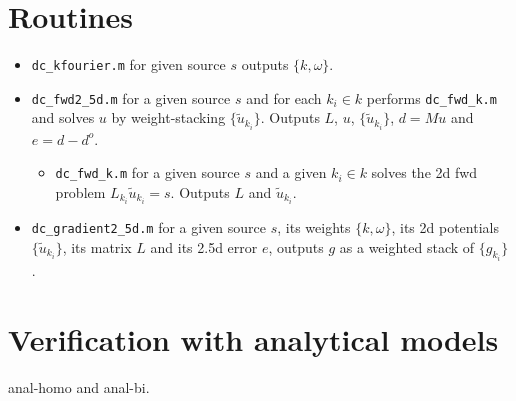 \documentclass[a4paper,12pt]{article}
\begin{document}
\section*{Routines}
\begin{itemize}
\item \color{boiseBlue}\texttt{dc\_kfourier.m} \color{black} for given source $s$ outputs $\{k,\omega\}$.
\item \color{boiseBlue}\texttt{dc\_fwd2\_5d.m} \color{black} for a given source $s$ and for each $k_i\in k$ performs \color{rojoAmor}\texttt{dc\_fwd\_k.m} \color{black} and solves $u$ by weight-stacking $\{\tilde{u}_{k_i}\}$. Outputs $L$, $u$, $\{\tilde{u}_{k_i}\}$, $d=Mu$ and $e=d-d^o$.
%
\begin{itemize}
\item[\textbullet] \color{rojoAmor}\texttt{dc\_fwd\_k.m} \color{black} for a given source $s$ and a given $k_i\in k$ solves the 2d fwd problem $L_{k_i}\tilde{u}_{k_i}=s$. Outputs $L$ and $\tilde{u}_{k_i}$.
\end{itemize}
%
\item \color{boiseBlue}\texttt{dc\_gradient2\_5d.m} \color{black} for a given source $s$, its weights $\{k,\omega\}$, its 2d potentials $\{\tilde{u}_{k_i}\}$, its matrix $L$ and its 2.5d error $e$, outputs $g$ as a weighted stack of $\{g_{k_i}\}$.
\end{itemize}
%
\section*{Verification with analytical models}
anal-homo and anal-bi.
%
%


\end{document}

